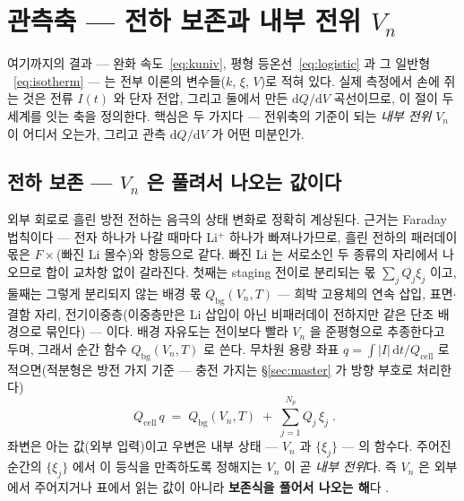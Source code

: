 \documentclass[11pt,a4paper]{article}
\newcommand{\dd}{\mathrm{d}}
\newcommand{\cell}{\mathrm{cell}}
\newcommand{\bg}{\mathrm{bg}}
\begin{document}
\section{관측축 — 전하 보존과 내부 전위 $V_n$}\label{sec:charge}
여기까지의 결과 — 완화 속도~\eqref{eq:kuniv}, 평형 등온선~\eqref{eq:logistic} 과 그 일반형
~\eqref{eq:isotherm} — 는 전부 이론의 변수들($k$, $\xi$, $V$)로 적혀 있다. 실제 측정에서 손에 쥐는
것은 전류 $I(t)$ 와 단자 전압, 그리고 둘에서 만든 $\dd Q/\dd V$ 곡선이므로, 이 절이 두 세계를 잇는
축을 정의한다. 핵심은 두 가지다 — 전위축의 기준이 되는 \emph{내부 전위} $V_n$ 이 어디서 오는가, 그리고
관측 $\dd Q/\dd V$ 가 어떤 미분인가.

\subsection{전하 보존 — $V_n$ 은 풀려서 나오는 값이다}
외부 회로로 흘린 방전 전하는 음극의 상태 변화로 정확히 계상된다. 근거는 Faraday 법칙이다 — 전자 하나가
나갈 때마다 Li$^+$ 하나가 빠져나가므로, 흘린 전하의 패러데이 몫은 $F\times$(빠진 Li 몰수)와 항등으로
같다. 빠진 Li 는
서로소인 두 종류의 자리에서 나오므로 합이 교차항 없이 갈라진다. 첫째는 staging 전이로 분리되는 몫
$\sum_jQ_j\xi_j$ 이고, 둘째는 그렇게 분리되지 않는 배경 몫 $Q_\bg(V_n,T)$ — 희박 고용체의 연속 삽입,
표면$\cdot$결함 자리, 전기이중층(이중층만은 Li 삽입이 아닌 비패러데이 전하지만 같은 단조 배경으로
묶인다) — 이다. 배경 자유도는 전이보다 빨라 $V_n$ 을 준평형으로 추종한다고 두며, 그래서 순간
함수 $Q_\bg(V_n,T)$ 로 쓴다. 무차원 용량 좌표 $q=\int|I|\,\dd t/Q_\cell$ 로 적으면(적분형은 방전
가지 기준 — 충전 가지는 \S\ref{sec:master} 가 방향 부호로 처리한다)
\begin{equation}
\boxed{\;Q_\cell\,q\;=\;Q_\bg(V_n,T)\;+\;\sum_{j=1}^{N_p}Q_j\,\xi_j\;.}
\label{eq:charge}
\end{equation}
좌변은 아는 값(외부 입력)이고 우변은 내부 상태 — $V_n$ 과 $\{\xi_j\}$ — 의 함수다. 주어진 순간의
$\{\xi_j\}$ 에서 이 등식을 만족하도록 정해지는 $V_n$ 이 곧 \emph{내부 전위}다. 즉 $V_n$ 은 외부에서
주어지거나 표에서 읽는 값이 아니라 \textbf{보존식을 풀어서 나오는 해}다 \cite{mckinnon1983,newman2004}.
\end{document}
